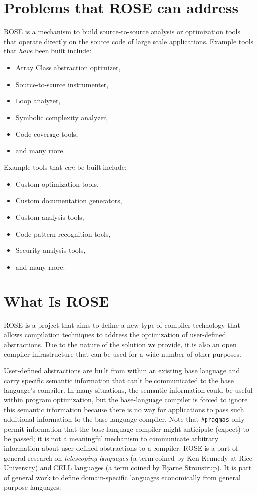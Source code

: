 \section{Problems that ROSE can address}
    ROSE is a mechanism to build source-to-source analysis or 
optimization tools that operate directly on the source code of large 
scale applications.  Example tools that {\em have} been built include:
\begin{itemize}
   \item Array Class abstraction optimizer,
   \item Source-to-source instrumenter,
   \item Loop analyzer,
   \item Symbolic complexity analyzer,
   \item Code coverage tools,
   \item and many more.
\end{itemize}
Example tools that {\em can} be built include:
\begin{itemize}
   \item Custom optimization tools,
   \item Custom documentation generators,
   \item Custom analysis tools,
   \item Code pattern recognition tools,
   \item Security analysis tools,
   \item and many more.
\end{itemize}


\section{What Is ROSE}
ROSE is a project that aims to define a new type of compiler technology that allows
compilation techniques to address the optimization of user-defined abstractions.
Due to the nature of the solution we provide, it is also an open compiler infrastructure
that can be used for a wide number of other purposes.

   User-defined abstractions are built from within an existing base language and
carry specific semantic information that can't be communicated to the base
language's compiler.  In many situations, the semantic information could be useful within
program optimization, but the base-language compiler is forced to ignore this semantic 
information because there is no way for applications to pass such additional information 
to the base-language compiler. Note that {\tt \#pragmas} only permit information that the 
base-language compiler might anticipate (expect) to be passed; it is not a meaningful 
mechanism to communicate arbitrary information about user-defined abstractions to a 
compiler.  ROSE is a part of general research on {\em telescoping languages} (a term 
coined by Ken Kennedy at Rice University) and CELL languages (a term coined by 
Bjarne Stroustrup).  It is part of general work to define domain-specific languages
economically from general purpose languages.

